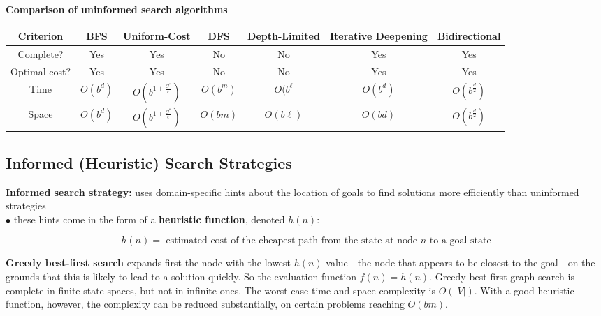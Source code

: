         \begin{center}
            \textbf{Comparison of uninformed search algorithms}
            \begin{tabular}{|c|c|c|c|c|c|c|}
                \hline
                \textbf{Criterion}  & BFS & Uniform-Cost & DFS & Depth-Limited & Iterative Deepening & Bidirectional \\
                \hline
                Complete?   & Yes   & Yes   & No    & No    & Yes   & Yes \\
                \hline
                Optimal cost?   & Yes   & Yes   & No    & No    & Yes   & Yes \\
                \hline
                Time    & $O(b^d)$  & $O\left(b^{1+\frac{C^*}{\epsilon}}\right)$    & $O(b^m)$ & $O(b^{\ell}$ & $O(b^d)$ & $O\left(b^\frac{d}{2}\right)$ \\
                \hline
                Space   & $O(b^d)$  & $O\left(b^{1+\frac{C^*}{\epsilon}}\right)$    & $O(bm)$ & $O(b\ell)$ & $O(bd)$ & $O\left(b^\frac{d}{2}\right)$ \\
                \hline
            \end{tabular}
        \end{center}

    \subsection{Informed (Heuristic) Search Strategies}     %

        \textbf{Informed search strategy:} uses domain-specific hints about the location of goals to find solutions more efficiently than uninformed strategies \\
        $\bullet$ these hints come in the form of a \textbf{heuristic function}, denoted $h(n)$:

        \[
            h(n) = \text{ estimated cost of the cheapest path from the state at node } n \text{ to a goal state}
        \]

        \textbf{Greedy best-first search} expands first the node with the lowest $h(n)$ value - the node that appears to be closest to the goal - on the grounds that this is likely to lead to a solution quickly. So the
        evaluation function $f(n) = h(n)$. Greedy best-first graph search is complete in finite state spaces, but not in infinite ones. The worst-case time and space complexity is $O(|V|)$. With a good heuristic function,
        however, the complexity can be reduced substantially, on certain problems reaching $O(bm)$. \\

